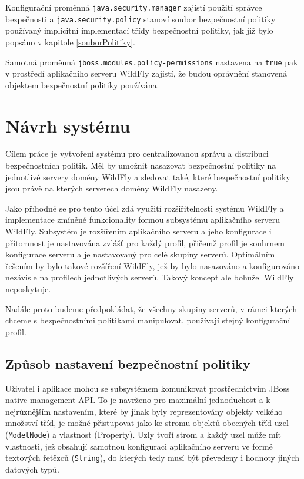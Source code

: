 Konfigurační proměnná {\tt java.security.manager} zajistí použití správce bezpečnosti a {\tt java.security.policy} stanoví soubor bezpečnostní politiky používaný implicitní implementací třídy bezpečnostní politiky, jak již bylo popsáno v kapitole \ref{souborPolitiky}.

Samotná proměnná {\tt jboss.modules.policy-permissions} nastavena na {\tt true} pak v prostředí aplikačního serveru WildFly zajistí, že budou oprávnění stanovená objektem bezpečnostní politiky používána.

\chapter{Návrh systému} \label{navrh}

Cílem práce je vytvoření systému pro centralizovanou správu a distribuci bezpečnostních politik. Měl by umožnit nasazovat bezpečnostní politiky na jednotlivé servery domény WildFly a sledovat také, které bezpečnostní politiky jsou právě na kterých serverech domény WildFly nasazeny.

Jako příhodné se pro tento účel zdá využití rozšiřitelnosti systému WildFly a implementace zmíněné funkcionality formou subsystému aplikačního serveru WildFly. Subsystém je rozšířením aplikačního serveru a jeho konfigurace i přítomnost je nastavována zvlášť pro každý profil, přičemž profil je souhrnem konfigurace serveru a je nastavovaný pro celé skupiny serverů. Optimálním řešením by bylo takové rozšíření WildFly, jež by bylo nasazováno a konfigurováno nezávisle na profilech jednotlivých serverů. Takový koncept ale bohužel WildFly neposkytuje.

Nadále proto budeme předpokládat, že všechny skupiny serverů, v rámci kterých chceme s bezpečnostními politikami manipulovat, používají stejný konfigurační profil.

\section{Způsob nastavení bezpečnostní politiky}

Uživatel i aplikace mohou se subsystémem komunikovat prostřednictvím JBoss native management API. To je navrženo pro maximální jednoduchost a k nejrůznějším nastavením, které by jinak byly reprezentovány objekty velkého množství tříd, je možné přistupovat jako ke stromu objektů obecných tříd uzel ({\tt ModelNode}) a vlastnost (Property). Uzly tvoří strom a každý uzel může mít vlastnosti, jež obsahují samotnou konfiguraci aplikačního serveru ve formě textových řetězců ({\tt String}), do kterých tedy musí být převedeny i hodnoty jiných datových typů. \cite{jbossDetypedManagement}

